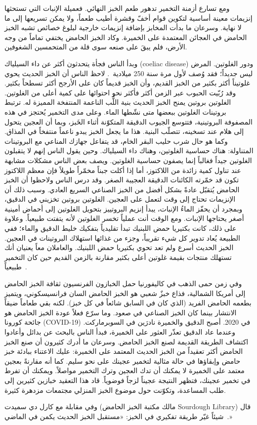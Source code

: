 ومع تسارع أزمنة التخمير تدهور طعم الخبز النهائي. فعميلة الإنبات التي تستحثها إنزيمات معينة أساسية لتكوين قوام أخفّ وقشرة أطيب طعماً، ولا يمكن تسريعها إلى ما لا نهاية. وسرعان ما بدأت المخابز بإضافة إنزيمات خارجية لبلوغ خصائص تشبه الخبز الحامض في العجائن المعتمدة على الخميرة. وكاد الخبز الحامض يختفي تماماً من وجه الأرض، فلم يبقَ على صنعه سوى قلة من المتحمسين الشغوفين.

وبدأ الناس فجأة يتحدثون أكثر عن داء السيلياك \textenglish{(coeliac disease)} ودور الغلوتين. المرض ليس جديداً؛ فقد وُصف لأول مرة سنة 250 ميلادية~\cite{coeliac+disease}. لاحظ الناس أن الخبز الحديث يحوي غلوتيناً أكثر بكثير من الخبز القديم، وأن الخبز قديماً كان على الأرجح أكثر تسطحاً بكثير. وقد رُبّيت الحبوب عبر الزمن أكثر فأكثر نحو احتوائها على كمية أعلى من الغلوتين. الغلوتين بروتين يمنح الخبز الحديث بنية اللُّب الناعمة المنتفخة المميزة له. ترتبط بروتينات الغلوتين ببعضها متى نشّطها الماء. وعلى مدى التخمير يُحتجز  في هذه المصفوفة البروتينية، فتتوسع الجيوب الدقيقة المتكوّنة أثناء الخَبز، وبما أن العجين يتحول إلى هلام عند تسخينه، تتصلّب البنية. هذا ما يجعل الخبز يبدو ناعماً منتفخاً في المذاق. وكما هو حال شرب حليب البقر الخام، قد يتفاعل جهازك المناعي مع البروتينات المتناولة: هناك حساسية الغلوتين، وهناك داء السيلياك. وحين يقول الناس إنهم لا يتقبلون الغلوتين جيداً فغالباً إنما يصفون حساسية الغلوتين. ويصف بعض الناس مشكلات مشابهة عند تناول كمية زائدة من اللاكتوز، أما إذا أكلت جبناً مخمّراً طويلاً فإن معظم اللاكتوز تكون قد خمّرته الكائنات الدقيقة العجيبة الصغر. وقد درس الناس ولاحظوا أن الخبز الحامض يُتقبّل عادةً بشكل أفضل من الخبز الصناعي السريع العادي. وسبب ذلك أن الإنزيمات تحتاج إلى وقت لتعمل على العجين. الغلوتين بروتين تخزيني في الدقيق، وبمجرد أن يحفّز الماءُ الإنبات، يبدأ إنزيم البروتييز بتحويل الغلوتين إلى أحماض أمينية أصغر يحتاجها الإنبات. ومع الوقت أنت عملياً تخسر الغلوتين لأنه يتفتت طبيعياً. وعلاوة على ذلك، كانت بكتيريا حمض اللبنيك تبدأ تقليدياً بتفكيك خليط الدقيق والماء؛ ففي الطبيعة يُعاد تدوير كل شيء تقريباً، وجزء من غذائها استهلاك البروتينات في العجين. الخبز الحديث أسرع ولم تعد تحوي بكتيريا حمض اللبنيك. والعاملان معاً يعنيان أنك تستهلك منتجات بقيمة غلوتين أعلى بكثير مقارنة بالزمن القديم حين كان التخمير طبيعياً~\cite{raffaella+di+cagno}.

وفي زمن حمى الذهب في كاليفورنيا حمل الخبازون الفرنسيون ثقافة الخبز الحامض إلى أمريكا الشمالية، فذاع خبزٌ شعبي هو الخبز الحامض السان فرانسيسكوني، ويتميز بطعمه الحامض الفريد (الذي كان في السابق شائعاً في كل خبز). لكنه بقي طعاماً ضيقاً الانتشار بينما كان الخبز الصناعي في صعود. وما سرّع فعلاً عودة الخبز الحامض هو جائحة كورونا \textenglish{(COVID-19)} في 2020. أصبح الدقيق والخميرة نادرَين في السوبرماركت. وعندما عاد الدقيق تعذّر العثور على الخميرة، فبدأ الناس بالبحث عن بدائل وأعادوا اكتشاف الطريقة القديمة لصنع الخبز الحامض. وسرعان ما أدرك كثيرون أن صنع الخبز الحامض أكثر تعقيداً من الخبز الحديث المعتمد على الخميرة: عليك الاعتناء ببادئة خبز حامض وإبقاؤها في حالة مثالية لتخمير عجينك على نحو سليم. كما أنه مقارنةً بعجين معتمد على الخميرة لا يمكنك أن تدك العجين وترك التخمير مواصلاً. ويمكنك أن تفرط في تخمير عجينك، فتظهر النتيجة عجيناً لزجاً فوضوياً. قاد هذا التعقيد خبازين كثيرين إلى طلب المساعدة، وتكوّنت حول موضوع الخبز المنزلي مجتمعات مزدهرة كثيرة.

وفي مقابلة مع كارل دي سميدت (مالك مكتبة الخبز الحامض \textenglish{Sourdough Library}) قال شيئاً غيّر طريقة تفكيري في الخبز: «مستقبل الخبز الحديث يكمن في الماضي~\cite{interview+karl+de+smedt}.»
